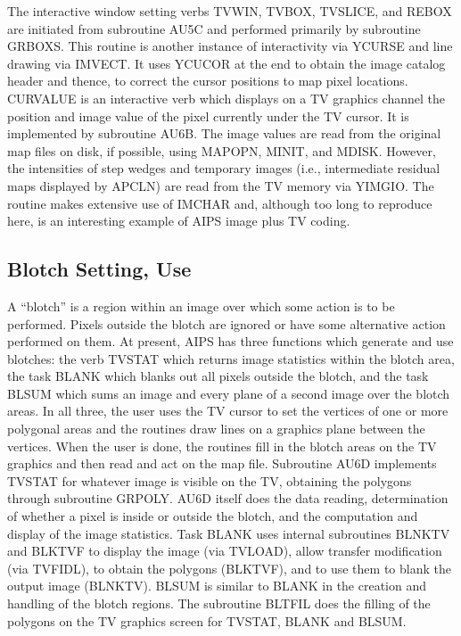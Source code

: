 The interactive window setting verbs TVWIN, TVBOX, TVSLICE, and REBOX
are initiated from subroutine AU5C and performed primarily by
subroutine GRBOXS. This routine is another instance of
interactivity via YCURSE and line drawing via IMVECT.  It
uses YCUCOR at the end to
obtain the image catalog header and thence, to correct the cursor
positions to map pixel locations.
CURVALUE is an interactive verb which displays on a TV graphics
channel the position and image value of the pixel currently under the
TV cursor.  It is implemented by subroutine AU6B.  The
image values are read from the original map files on disk, if possible, using
MAPOPN, MINIT, and MDISK.
However, the intensities of step wedges and
temporary images (i.e., intermediate residual maps displayed by APCLN)
are read from the TV memory via YIMGIO.  The routine makes extensive
use of IMCHAR and, although too long to reproduce here, is an
interesting example of AIPS image plus TV coding.

\subsection{Blotch Setting, Use}
A ``blotch'' is a region within an image over which some action is to be
performed.  Pixels outside the blotch are ignored or have some
alternative action performed on them.  At present, AIPS has three
functions which generate and use blotches: the verb TVSTAT which
returns image statistics within the blotch area, the task
BLANK which
blanks out all pixels outside the blotch, and the task BLSUM
which sums an image and every plane of a second image over the blotch areas.
In all three, the user uses the TV cursor to set the vertices of one
or more polygonal areas and the routines draw lines on a graphics
plane between the vertices. When the user is done, the routines fill
in the blotch areas on the TV graphics and then read and act on the
map file. Subroutine AU6D implements TVSTAT for whatever image
is visible on the TV, obtaining the polygons through subroutine
GRPOLY.
AU6D itself does the data reading, determination of whether a pixel is
inside or outside the blotch, and the computation and display of the
image statistics.  Task BLANK uses internal subroutines
BLNKTV and BLKTVF to display the image (via TVLOAD),
allow transfer modification (via TVFIDL), to obtain the
polygons (BLKTVF), and to use
them to blank the output image (BLNKTV).  BLSUM is similar to BLANK in
the creation and handling of the blotch regions. The subroutine
BLTFIL
does the filling of the polygons on the TV graphics screen for TVSTAT,
BLANK and BLSUM.

